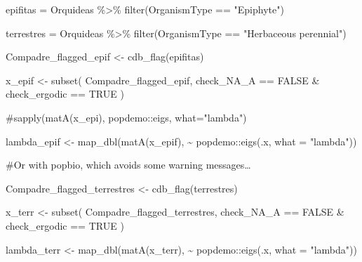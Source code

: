 \documentclass[
  12pt,
  letterpaper,
]{book}
\newenvironment{Shaded}{\begin{snugshade}}{\end{snugshade}}
\newcommand{\AttributeTok}[1]{\textcolor[rgb]{0.40,0.45,0.13}{#1}}
\newcommand{\CommentTok}[1]{\textcolor[rgb]{0.37,0.37,0.37}{#1}}
\newcommand{\ConstantTok}[1]{\textcolor[rgb]{0.56,0.35,0.01}{#1}}
\newcommand{\FunctionTok}[1]{\textcolor[rgb]{0.28,0.35,0.67}{#1}}
\newcommand{\NormalTok}[1]{\textcolor[rgb]{0.00,0.23,0.31}{#1}}
\newcommand{\OtherTok}[1]{\textcolor[rgb]{0.00,0.23,0.31}{#1}}
\newcommand{\SpecialCharTok}[1]{\textcolor[rgb]{0.37,0.37,0.37}{#1}}
\newcommand{\StringTok}[1]{\textcolor[rgb]{0.13,0.47,0.30}{#1}}
\begin{document}
\begin{Shaded}
\begin{Highlighting}[]
\NormalTok{epifitas }\OtherTok{=}\NormalTok{ Orquideas }\SpecialCharTok{\%\textgreater{}\%}
  \FunctionTok{filter}\NormalTok{(OrganismType }\SpecialCharTok{==} \StringTok{"Epiphyte"}\NormalTok{)}

\NormalTok{terrestres }\OtherTok{=}\NormalTok{ Orquideas }\SpecialCharTok{\%\textgreater{}\%}
  \FunctionTok{filter}\NormalTok{(OrganismType }\SpecialCharTok{==} \StringTok{"Herbaceous perennial"}\NormalTok{)}
\end{Highlighting}
\end{Shaded}

\begin{Shaded}
\begin{Highlighting}[]
\NormalTok{Compadre\_flagged\_epif }\OtherTok{\textless{}{-}} \FunctionTok{cdb\_flag}\NormalTok{(epifitas)}

\NormalTok{x\_epif }\OtherTok{\textless{}{-}} \FunctionTok{subset}\NormalTok{(}
\NormalTok{  Compadre\_flagged\_epif,}
\NormalTok{  check\_NA\_A }\SpecialCharTok{==} \ConstantTok{FALSE} \SpecialCharTok{\&}\NormalTok{ check\_ergodic }\SpecialCharTok{==} \ConstantTok{TRUE}
\NormalTok{)}

\CommentTok{\#sapply(matA(x\_epi), popdemo::eigs, what="lambda")}

\NormalTok{lambda\_epif }\OtherTok{\textless{}{-}} \FunctionTok{map\_dbl}\NormalTok{(}\FunctionTok{matA}\NormalTok{(x\_epif), }\SpecialCharTok{\textasciitilde{}}\NormalTok{ popdemo}\SpecialCharTok{::}\FunctionTok{eigs}\NormalTok{(.x, }\AttributeTok{what =} \StringTok{"lambda"}\NormalTok{))}

\CommentTok{\#Or with popbio, which avoids some warning messages…}

\NormalTok{Compadre\_flagged\_terrestres }\OtherTok{\textless{}{-}} \FunctionTok{cdb\_flag}\NormalTok{(terrestres)}


\NormalTok{x\_terr }\OtherTok{\textless{}{-}} \FunctionTok{subset}\NormalTok{(}
\NormalTok{  Compadre\_flagged\_terrestres,}
\NormalTok{  check\_NA\_A }\SpecialCharTok{==} \ConstantTok{FALSE} \SpecialCharTok{\&}\NormalTok{ check\_ergodic }\SpecialCharTok{==} \ConstantTok{TRUE}
\NormalTok{)}



\NormalTok{lambda\_terr }\OtherTok{\textless{}{-}} \FunctionTok{map\_dbl}\NormalTok{(}\FunctionTok{matA}\NormalTok{(x\_terr), }\SpecialCharTok{\textasciitilde{}}\NormalTok{ popdemo}\SpecialCharTok{::}\FunctionTok{eigs}\NormalTok{(.x, }\AttributeTok{what =} \StringTok{"lambda"}\NormalTok{))}
\end{Highlighting}
\end{Shaded}
\end{document}
